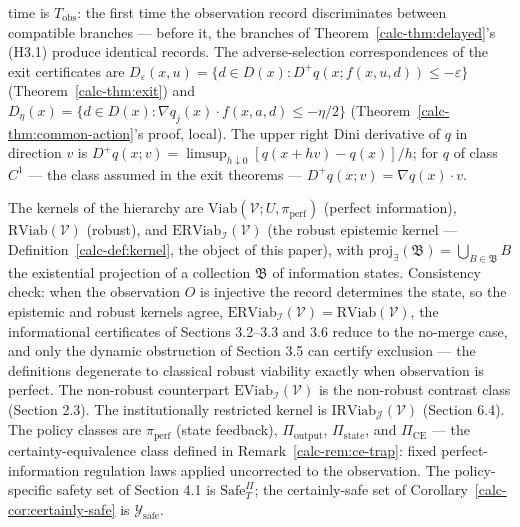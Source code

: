 \documentclass[10pt,twocolumn]{article}
\theoremstyle{definition}
\begin{document}
time is \(T_{\mathrm{obs}}\): the first time the observation record
discriminates between compatible branches --- before it, the branches of
Theorem~\ref{calc-thm:delayed}'s (H3.1) produce identical records. The adverse-selection
correspondences of the exit certificates are
\(D_{\varepsilon}(x,u) = \{ d \in D(x) : D^+ q(x; f(x,u,d)) \le -\varepsilon \}\)
(Theorem~\ref{calc-thm:exit}) and
\(D_{\eta}(x) = \{ d \in D(x) : \nabla q_j(x) \cdot f(x, a, d) \le -\eta/2 \}\)
(Theorem~\ref{calc-thm:common-action}'s proof, local). The upper
right Dini derivative of \(q\) in direction \(v\) is
\(D^+ q(x; v) = \limsup_{h \downarrow 0} [q(x + hv) - q(x)]/h\); for
\(q\) of class \(C^1\) --- the class assumed in the exit theorems ---
\(D^+ q(x; v) = \nabla q(x) \cdot v\).

The kernels of the hierarchy are
\(\mathrm{Viab}(\mathcal{V}; U, \pi_{\mathrm{perf}})\) (perfect
information), \(\mathrm{RViab}(\mathcal{V})\) (robust), and
\(\mathrm{ERViab}_{\mathcal{I}}(\mathcal{V})\) (the robust epistemic
kernel --- Definition~\ref{calc-def:kernel}, the object of this paper), with
\(\mathrm{proj}_{\exists}(\mathfrak{B}) = \bigcup_{B \in \mathfrak{B}} B\)
the existential projection of a collection \(\mathfrak{B}\) of information states. Consistency check: when the observation \(O\) is injective the record determines the state, so the epistemic and robust kernels agree, \(\mathrm{ERViab}_{\mathcal{I}}(\mathcal{V}) = \mathrm{RViab}(\mathcal{V})\), the informational certificates of Sections 3.2--3.3 and 3.6 reduce to the no-merge case, and only the dynamic obstruction of Section 3.5 can certify exclusion --- the definitions degenerate to classical robust viability exactly when observation is perfect. The non-robust counterpart
\(\mathrm{EViab}_{\mathcal{I}}(\mathcal{V})\) is the non-robust contrast class (Section 2.3). The institutionally restricted kernel is \(\mathrm{IRViab}_{\mathcal{J}}(\mathcal{V})\) (Section 6.4). The policy classes
are \(\pi_{\mathrm{perf}}\) (state feedback), \(\Pi_{\mathrm{output}}\),
\(\Pi_{\mathrm{state}}\), and \(\Pi_{\mathrm{CE}}\) --- the
certainty-equivalence class defined in Remark~\ref{calc-rem:ce-trap}: fixed
perfect-information regulation laws applied uncorrected to the
observation. The policy-specific safety set of Section 4.1 is
\(\mathrm{Safe}^{\Pi}_T\); the certainly-safe set of Corollary~\ref{calc-cor:certainly-safe} is
\(\mathcal{Y}_{\mathrm{safe}}\).
\end{document}
